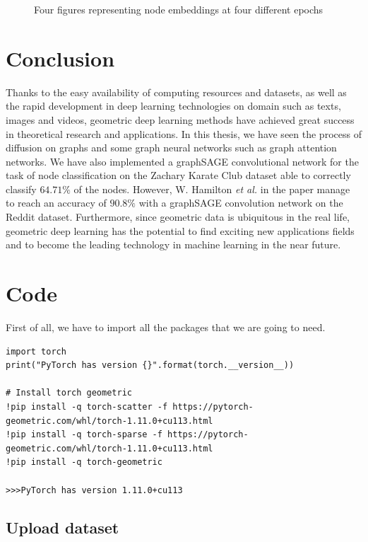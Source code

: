 \documentclass[12pt,a4paper]{report}
\theoremstyle{definition}
\begin{document}
\begin{figure}
\begin{subfigure}[b]{0.45\textwidth}
    \end{subfigure}
    \caption{Four figures representing node embeddings at four different epochs}
    \label{fig:4_embedding}
\end{figure}


\chapter*{Conclusion}
\label{cap:conclusion}

Thanks to the easy availability of computing resources and datasets, as well as the rapid development in deep learning technologies on domain such as texts, images and videos, geometric deep learning methods have achieved great success in theoretical research and applications.
In this thesis, we have seen the process of diffusion on graphs and some graph neural networks such as graph attention networks.
We have also implemented a graphSAGE convolutional network for the task of node classification on the Zachary Karate Club dataset able to correctly classify $64.71\%$ of the nodes.
However, W. Hamilton \textit{et al.} in the paper \cite{graphsage} manage to reach an accuracy of $90.8\%$ with a graphSAGE convolution network on the Reddit dataset.
Furthermore, since geometric data is ubiquitous in the real life, geometric deep learning has the potential to find exciting new applications fields and to become the leading technology in machine learning in the near future.

\appendix

\chapter{Code}
\label{app:code}

First of all, we have to import all the packages that we are going to need.
\begin{lstlisting}
import torch
print("PyTorch has version {}".format(torch.__version__))

# Install torch geometric
!pip install -q torch-scatter -f https://pytorch-geometric.com/whl/torch-1.11.0+cu113.html
!pip install -q torch-sparse -f https://pytorch-geometric.com/whl/torch-1.11.0+cu113.html
!pip install -q torch-geometric

>>>PyTorch has version 1.11.0+cu113
\end{lstlisting}

\section{Upload dataset}
\label{sec:upload_dataset}
\end{document}
